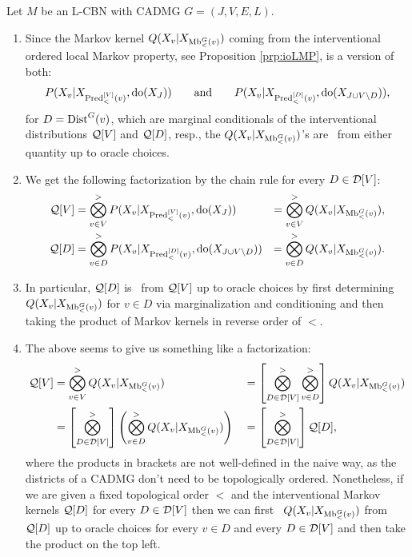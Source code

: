 \begin{Rem} 
    \label{rem:Q-dist-ident}
    Let $M$ be an L-CBN with \observational CADMG $G=(J,V,E,L)$.
    \begin{enumerate}
        \item Since the Markov kernel $Q(X_v|X_{\mathrm{Mb}^G_<(v)})$ coming from the interventional ordered local Markov property, 
            see Proposition \ref{prp:ioLMP}, is a version of both:
          \[ P(X_v|X_{\mathrm{Pred}^{[V]}_<(v)},\operatorname{do}(X_J)) \qquad \text{and} \qquad P(X_v|X_{\mathrm{Pred}^{[D]}_<(v)},\operatorname{do}(X_{J \cup V\setminus D})),\]
                for $D=\mathrm{Dist}^G(v)$, which are marginal conditionals of the interventional distributions $\mathcal{Q}[V]$ and $\mathcal{Q}[D]$, resp.,
                the $Q(X_v|X_{\mathrm{Mb}^G_<(v)})$'s are \trackable\ from either quantity up to oracle choices.
            \item We get the following factorization by the chain rule for every $D \in \mathcal{D}[V]$: %
               \begin{align*}
                   \mathcal{Q}[V] &= \bigotimes_{v \in V}^> P(X_v|X_{\mathrm{Pred}^{[V]}_<(v)},\operatorname{do}(X_J)) &= \bigotimes_{v \in V}^> Q(X_v|X_{\mathrm{Mb}^G_<(v)}), \\
                   \mathcal{Q}[D] &= \bigotimes_{v \in D}^> P(X_v|X_{\mathrm{Pred}^{[D]}_<(v)},\operatorname{do}(X_{J \cup V\setminus D})) &= \bigotimes_{v \in D}^> Q(X_v|X_{\mathrm{Mb}^G_<(v)}).
               \end{align*}
           \item In particular, $\mathcal{Q}[D]$ is \trackable\ from $\mathcal{Q}[V]$ up to oracle choices 
               by first determining $Q(X_v|X_{\mathrm{Mb}^G_<(v)})$ for $v \in D$  
               via marginalization and conditioning and then taking the product of Markov kernels in reverse order of $<$.
            \item The above seems to give us something like a factorization:
       \begin{align*}
           \mathcal{Q}[V] &= \bigotimes_{v \in V}^> Q(X_v|X_{\mathrm{Mb}^G_<(v)}) 
            && = \left [ \bigotimes_{D \in \mathcal{D}[V]}^> \bigotimes_{v \in D}^>  \right ] Q(X_v|X_{\mathrm{Mb}^G_<(v)}) \\
            & = \left [ \bigotimes_{D \in \mathcal{D}[V]}^> \right ] \left ( \bigotimes_{v \in D}^>  Q(X_v|X_{\mathrm{Mb}^G_<(v)}) \right )  
            && = \left [ \bigotimes_{D \in \mathcal{D}[V]}^>\right ] \mathcal{Q}[D],             
       \end{align*}
         where the products in brackets are not well-defined in the naive way, 
         as the districts of a CADMG don't need to be topologically ordered.
         Nonetheless, if we are given a fixed topological order $<$ and the interventional Markov kernels $\mathcal{Q}[D]$ 
         for every $D \in \mathcal{D}[V]$ 
         then we can first \track\ $Q(X_v|X_{\mathrm{Mb}^G_<(v)})$ from $\mathcal{Q}[D]$ up to oracle choices
         for every $v \in D$ and every $D \in \mathcal{D}[V]$ and then take the product
         on the top left. 
    \end{enumerate}
\end{Rem}

